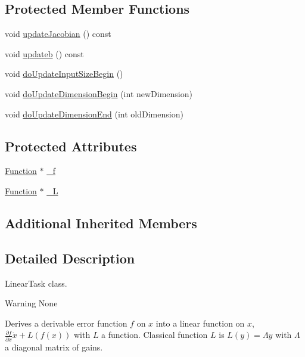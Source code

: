\subsection*{Protected Member Functions}
\begin{DoxyCompactItemize}
\item 
void \hyperlink{classocra_1_1LinearTask_a9d2845b746d3af713458b9246b011328}{update\+Jacobian} () const
\item 
void \hyperlink{classocra_1_1LinearTask_a83fc0c9f16a8338d3e66db91fef2a319}{updateb} () const
\item 
void \hyperlink{classocra_1_1LinearTask_a9db869913d96b6917b2d40211761c019}{do\+Update\+Input\+Size\+Begin} ()
\item 
void \hyperlink{classocra_1_1LinearTask_a31c1140426b2f327e6a126fd917b04cd}{do\+Update\+Dimension\+Begin} (int new\+Dimension)
\item 
void \hyperlink{classocra_1_1LinearTask_aab97e5a858909e724ae8426f141c319b}{do\+Update\+Dimension\+End} (int old\+Dimension)
\end{DoxyCompactItemize}
\subsection*{Protected Attributes}
\begin{DoxyCompactItemize}
\item 
\hyperlink{classocra_1_1Function}{Function} $\ast$ \hyperlink{classocra_1_1LinearTask_ab79a5c0caf93e7ecbc214ad40a8d2701}{\+\_\+f}
\item 
\hyperlink{classocra_1_1Function}{Function} $\ast$ \hyperlink{classocra_1_1LinearTask_a9ce434a1d6641d486c20476b8f8a366d}{\+\_\+L}
\end{DoxyCompactItemize}
\subsection*{Additional Inherited Members}


\subsection{Detailed Description}
Linear\+Task class. 

\begin{DoxyWarning}{Warning}
None
\end{DoxyWarning}
Derives a derivable error function $ f $ on $ x $ into a linear function on $ x $, $ \frac{\partial f}{\partial x} \dot{x} + L(f(x)) $ with $ L $ a function. Classical function $ L $ is $ L(y) = \Lambda y $ with $ \Lambda $ a diagonal matrix of gains. 

